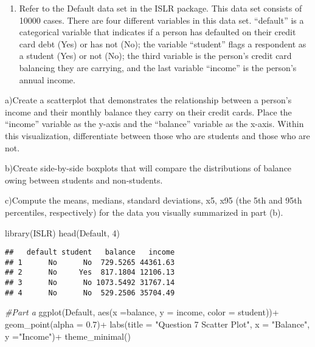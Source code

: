 \documentclass[
]{article}
\newenvironment{Shaded}{\begin{snugshade}}{\end{snugshade}}
\newcommand{\AttributeTok}[1]{\textcolor[rgb]{0.77,0.63,0.00}{#1}}
\newcommand{\CommentTok}[1]{\textcolor[rgb]{0.56,0.35,0.01}{\textit{#1}}}
\newcommand{\DecValTok}[1]{\textcolor[rgb]{0.00,0.00,0.81}{#1}}
\newcommand{\FloatTok}[1]{\textcolor[rgb]{0.00,0.00,0.81}{#1}}
\newcommand{\FunctionTok}[1]{\textcolor[rgb]{0.00,0.00,0.00}{#1}}
\newcommand{\NormalTok}[1]{#1}
\newcommand{\SpecialCharTok}[1]{\textcolor[rgb]{0.00,0.00,0.00}{#1}}
\newcommand{\StringTok}[1]{\textcolor[rgb]{0.31,0.60,0.02}{#1}}
\providecommand{\tightlist}{%
  \setlength{\itemsep}{0pt}\setlength{\parskip}{0pt}}
\begin{document}
\begin{enumerate}
\def\labelenumi{\arabic{enumi}.}
\setcounter{enumi}{6}
\tightlist
\item
  Refer to the Default data set in the ISLR package. This data set
  consists of 10000 cases. There are four different variables in this
  data set. ``default'' is a categorical variable that indicates if a
  person has defaulted on their credit card debt (Yes) or has not (No);
  the variable ``student'' flags a respondent as a student (Yes) or not
  (No); the third variable is the person's credit card balancing they
  are carrying, and the last variable ``income'' is the person's annual
  income.
\end{enumerate}

a)Create a scatterplot that demonstrates the relationship between a
person's income and their monthly balance they carry on their credit
cards. Place the ``income'' variable as the y-axis and the ``balance''
variable as the x-axis. Within this visualization, differentiate between
those who are students and those who are not.

b)Create side-by-side boxplots that will compare the distributions of
balance owing between students and non-students.

c)Compute the means, medians, standard deviations, x5, x95 (the 5th and
95th percentiles, respectively) for the data you visually summarized in
part (b).

\begin{Shaded}
\begin{Highlighting}[]
\FunctionTok{library}\NormalTok{(ISLR)}
\FunctionTok{head}\NormalTok{(Default, }\DecValTok{4}\NormalTok{)}
\end{Highlighting}
\end{Shaded}

\begin{verbatim}
##   default student   balance   income
## 1      No      No  729.5265 44361.63
## 2      No     Yes  817.1804 12106.13
## 3      No      No 1073.5492 31767.14
## 4      No      No  529.2506 35704.49
\end{verbatim}

\begin{Shaded}
\begin{Highlighting}[]
\CommentTok{\#Part a}
\FunctionTok{ggplot}\NormalTok{(Default, }\FunctionTok{aes}\NormalTok{(}\AttributeTok{x =}\NormalTok{balance, }\AttributeTok{y =}\NormalTok{ income, }\AttributeTok{color =}\NormalTok{ student))}\SpecialCharTok{+}
  \FunctionTok{geom\_point}\NormalTok{(}\AttributeTok{alpha =} \FloatTok{0.7}\NormalTok{)}\SpecialCharTok{+}
  \FunctionTok{labs}\NormalTok{(}\AttributeTok{title =} \StringTok{"Question 7 Scatter Plot"}\NormalTok{, }\AttributeTok{x =} \StringTok{"Balance"}\NormalTok{, }\AttributeTok{y =}\StringTok{"Income"}\NormalTok{)}\SpecialCharTok{+}
  \FunctionTok{theme\_minimal}\NormalTok{()}
\end{Highlighting}
\end{Shaded}
\end{document}
